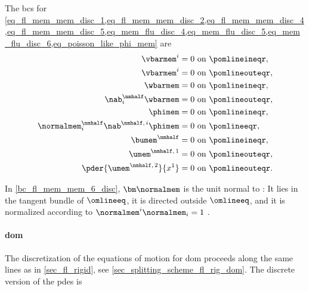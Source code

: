 The \acp{bc} for \cref{eq_fl_mem_mem_disc_1,eq_fl_mem_mem_disc_2,eq_fl_mem_mem_disc_4,eq_fl_mem_mem_disc_5,eq_mem_flu_disc_4,eq_mem_flu_disc_5,eq_mem_flu_disc_6,eq_poisson_like_phi_mem} are
\begin{align}
        \label{bc_fl_mem_mem_1_disc}
        \vbarmem^i                                         & = 0 \text{ on } \pomlineineqr,  \\
        \label{bc_fl_mem_mem_2_disc}
        \vbarmem^i                                         & = 0 \text{ on } \pomlineouteqr, \\
        \label{bc_fl_mem_mem_3_disc}
        \wbarmem                                           & = 0 \text{ on } \pomlineineqr,  \\
        \label{bc_fl_mem_mem_4_disc}
        \nab^\nmhalf_i \wbarmem                            & = 0 \text{ on } \pomlineouteqr, \\
        \label{bc_fl_mem_mem_5_disc}
        \phimem                                            & = 0 \text{ on } \pomlineineqr,  \\
        \label{bc_fl_mem_mem_6_disc}
        \normalmem^\nmhalf_i  \nab^{\nmhalf, \, i} \phimem & = 0 \text{ on } \pomlineeqr,    \\
        \label{bc_fl_mem_mem_7_disc}
        \bumem^{\nmhalf}                                   & = 0 \text{ on } \pomlineineqr,  \\
        \label{bc_fl_mem_mem_8_disc}
        \umem^{\nmhalf,\, 1}                               & = 0 \text{ on } \pomlineouteqr, \\
        \label{bc_fl_mem_mem_9_disc}
        \pder{\umem^{\nmhalf, \, 2}}{x^1}                  & = 0 \text{ on } \pomlineouteqr.
\end{align}


In \cref{bc_fl_mem_mem_6_disc}, $\bm \normalmem$ is the unit normal to \pomline{}: It lies in the tangent bundle of $\omlineeq$, it is directed  outside $\omlineeq$, and it is normalized according to $\normalmem^i \normalmem_i = 1$ \cite{reallGeneralRelativity,marchiafavaAppuntiDiGeometria2005,worthmullerIRENEFluIdLayeR2025}.

\paragraph{\Acl{dom}}\label{sec_temp_discretization_mem_dom}

The discretization of the equations of motion for  \ac{dom} proceeds along the same lines as in \cref{sec_fl_rigid}, see \cref{sec_splitting_scheme_fl_rig_dom}. The discrete version of the \acp{pde} \crefs{\eqsdom} is

